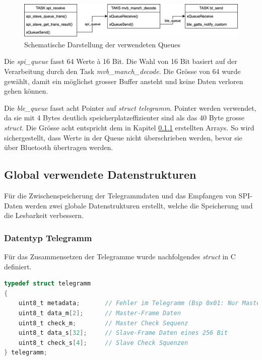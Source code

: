 \begin{figure}[H]
    \centering
    \includegraphics[width=0.9\linewidth]{Figures/Chap3/ESP/FreeRTOS/Queue.png}
    \caption{Schematische Darstellung der verwendeten Queues}
    \label{fig:QueueSchema}
\end{figure}

Die \textit{spi\_queue} fasst 64 Werte à 16 Bit. Die Wahl von 16 Bit basiert auf der Verarbeitung durch den Task \textit{mvb\_manch\_decode}. Die Grösse von 64 wurde gewählt, damit ein möglichst grosser Buffer ansteht und keine Daten verloren gehen können.

Die \textit{ble\_queue} fasst acht Pointer auf \textit{struct telegramm}. Pointer werden verwendet, da sie mit 4 Bytes deutlich speicherplatzeffizienter sind als das 40 Byte grosse \textit{struct}. Die Grösse acht entspricht dem in Kapitel \ref{subsub:DataTelegramm} erstellten Arrays. So wird sichergestellt, dass Werte in der Queue nicht überschrieben werden, bevor sie über Bluetooth übertragen werden.

\subsection{Global verwendete Datenstrukturen}
\label{sub:GlobalDtatStruct}
Für die Zwischenspeicherung der Telegrammdaten und das Empfangen von SPI-Daten werden zwei globale Datenstrukturen erstellt, welche die Speicherung und die Lesbarkeit verbessern. 

\subsubsection{Datentyp Telegramm}
\label{subsub:DataTelegramm}
Für das Zusammensetzen der Telegramme wurde nachfolgendes \textit{struct} in C definiert.

\begin{lstlisting}[language=C]
typedef struct telegramm
{
    uint8_t metadata;       // Fehler im Telegramm (Bsp 0x01: Nur Master-Frame)
    uint8_t data_m[2];      // Master-Frame Daten
    uint8_t check_m;        // Master Check Sequenz
    uint8_t data_s[32];     // Slave-Frame Daten eines 256 Bit
    uint8_t check_s[4];     // Slave Check Squenzen
} telegramm;
\end{lstlisting}

